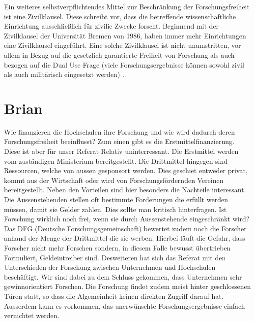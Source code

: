 \documentclass{pmwk}
\begin{document}
Ein weiteres selbstverpflichtendes Mittel zur Beschränkung der Forschungsfreiheit ist eine Zivilklausel. Diese schreibt vor, dass die betreffende wissenschaftliche Einrichtung ausschließlich für zivilie Zwecke forscht. Beginnend mit der Zivilklausel der Universität Bremen von 1986, haben immer mehr Einrichtungen eine Zivilklausel eingeführt. Eine solche Zivilklausel ist nicht unumstritten, vor allem in Bezug auf die gesetzlich garantierte Freiheit von Forschung als auch bezogen auf die Dual Use Frage (viele Forschungsergebnisse können sowohl zivil als auch militärisch eingesetzt werden) \cite{JKrause}. 

\section*{Brian}
Wie finanzieren die Hochschulen ihre Forschung und wie wird dadurch deren Forschungsfreiheit beeinflusst? Zum einen gibt es die Erstmittelfinanzierung. Diese ist aber für unser Referat Relativ uninterressant. Die Erstmittel werden vom zuständigen Ministerium bereitgestellt. Die Drittmittel hingegen sind Ressourcen, welche von aussen gesponsort werden. Dies geschiet entweder privat, kommt aus der Wirtschaft oder wird von Forschungsfördernden Vereinen bereitgestellt. Neben den Vorteilen sind hier besonders die Nachteile interessant. Die Aussenstehenden stellen oft bestimmte Forderungen die erfüllt werden müssen, damit sie Gelder zahlen. Dies sollte man kritisch hinterfragen. Ist Forschung wirklich noch frei, wenn sie durch Aussenstehende eingeschränkt wird? Das DFG (Deutsche Forschungsgemeinschaft) bewertet zudem noch die Forscher anhand der Menge der Drittmittel die sie werben. Hierbei läuft die Gefahr, dass Forscher nicht mehr Forschen sondern, in diesem Falle bewusst übertrieben Formuliert, Geldeintreiber sind. Desweiteren hat sich das Referat mit den Unterschieden der Forschung zwischen Unternehmen und Hochschulen beschäftigt. Wir sind dabei zu dem Schluss gekommen, dass Unternehmen sehr gewinnorientiert Forschen. Die Forschung findet zudem meist hinter geschlossenen Türen statt, so dass die Algemeinheit keinen direkten Zugriff darauf hat. Ausserdem kann es vorkommen, das unerwünschte Forschungsergebnisse einfach vernichtet werden.
\end{document}
